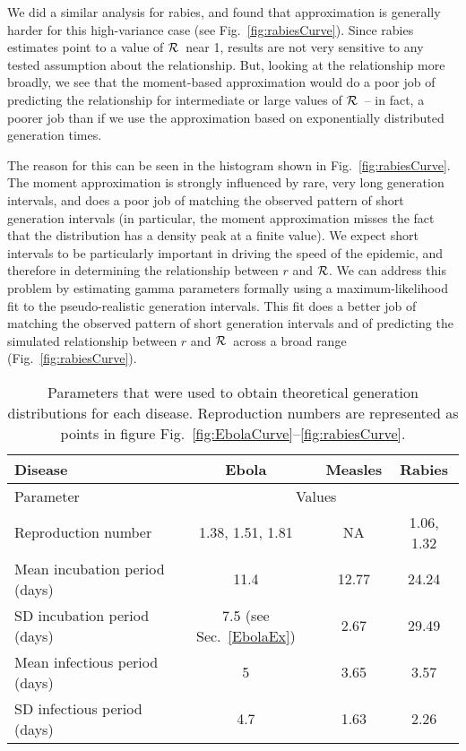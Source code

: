 \documentclass[12pt]{article}
\newcommand{\RR}{\ensuremath{{\cal R}}}
\newcommand{\fref}[1]{Fig.~\ref{fig:#1}}
\newcommand{\sref}[1]{Sec.~\ref{#1}}
\newcommand{\frange}[2]{Fig.~\ref{fig:#1}--\ref{fig:#2}}
\newcommand{\tlab}[1]{\label{tab:#1}}
\begin{document}
We did a similar analysis for rabies, and found that approximation is generally harder for this high-variance case (see \fref{rabiesCurve}). Since rabies estimates point to a value of \RR\ near 1, results are not very sensitive to any tested assumption about the relationship. But, looking at the relationship more broadly, we see that the moment-based approximation would do a poor job of predicting the relationship for intermediate or large values of \RR\ -- in fact, a poorer job than if we use the approximation based on exponentially distributed generation times. 

The reason for this can be seen in the histogram shown in \fref{rabiesCurve}. The moment approximation is strongly influenced by rare, very long generation intervals, and does a poor job of matching the observed pattern of short generation intervals (in particular, the moment approximation misses the fact that the distribution has a density peak at a finite value). We expect short intervals to be particularly important in driving the speed of the epidemic, and therefore in determining the relationship between $r$ and \RR. We can address this problem by estimating gamma parameters formally using a maximum-likelihood fit to the pseudo-realistic generation intervals. This fit does a better job of matching the observed pattern of short generation intervals and of predicting the simulated relationship between $r$ and \RR\ across a broad range (\fref{rabiesCurve}).

\begin{table}[h!]
\centering
\begin{tabular}{l*{3}{c}}
\hline
Disease & Ebola & Measles & Rabies\\
\hline
Parameter & \multicolumn{3}{c}{Values}\\
\hline
Reproduction number & 1.38, 1.51, 1.81 \cite{AylwBarb14} & NA & 1.06, 1.32 \cite{HampDush09} \\
Mean incubation period (days) & 11.4 \cite{AylwBarb14} & 12.77 \cite{LessReic09}  & 24.24 \cite{HampDush09} \\
SD incubation period (days) & 7.5 (see \sref{EbolaEx}) & 2.67 \cite{LessReic09} & 29.49 \cite{HampDush09} \\
Mean infectious period (days) & 5 \cite{AylwBarb14} & 3.65 \cite{Lloy01} & 3.57 \cite{HampDush09} \\
SD infectious period (days) & 4.7 \cite{AylwBarb14} & 1.63 \cite{Lloy01} & 2.26 \cite{HampDush09}
\end{tabular}
\caption{Parameters that were used to obtain theoretical generation distributions for each disease. Reproduction numbers are represented as points in figure \frange{EbolaCurve}{rabiesCurve}.}
\tlab{parameters}
\end{table}
\end{document}
